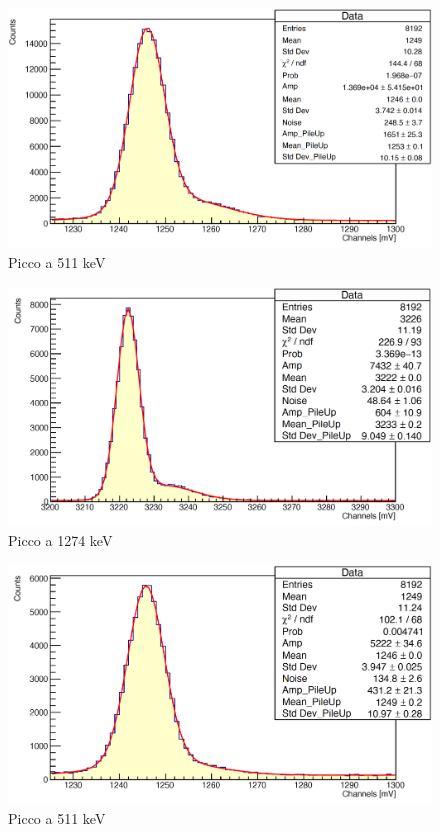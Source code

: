 \documentclass[a4paper,10pt]{article}
\begin{document}
\begin{figure}[H]
    \centering
    \includegraphics[scale=0.45]{appendice/spettri/NaPb1_58}
    \caption{Picco a 511 keV}
\end{figure}
\begin{figure}[H]
    \centering
    \includegraphics[scale=0.45]{appendice/spettri/NaPb2_58}
    \caption{Picco a 1274 keV}
\end{figure}
\begin{figure}[H]
    \centering
    \includegraphics[scale=0.45]{appendice/spettri/NaPb1_108}
    \caption{Picco a 511 keV}
\end{figure}
\end{document}
